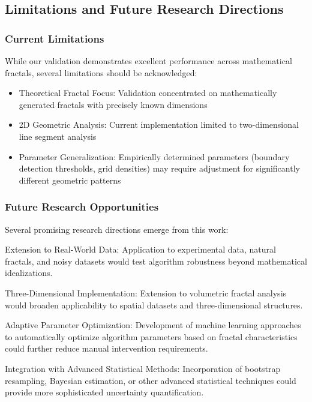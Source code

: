 \documentclass[preprint,12pt]{elsarticle}
\def\textbf#1{#1}%
\begin{document}
\subsection{Limitations and Future Research Directions}

\subsubsection{Current Limitations}

While our validation demonstrates excellent performance across mathematical fractals, several limitations should be acknowledged:

\begin{itemize}
\item \textbf{Theoretical Fractal Focus}: Validation concentrated on mathematically generated fractals with precisely known dimensions
\item \textbf{2D Geometric Analysis}: Current implementation limited to two-dimensional line segment analysis
\item \textbf{Parameter Generalization}: Empirically determined parameters (boundary detection thresholds, grid densities) may require adjustment for significantly different geometric patterns
\end{itemize}

\subsubsection{Future Research Opportunities}

Several promising research directions emerge from this work:

\textbf{Extension to Real-World Data}: Application to experimental data, natural fractals, and noisy datasets would test algorithm robustness beyond mathematical idealizations.

\textbf{Three-Dimensional Implementation}: Extension to volumetric fractal analysis would broaden applicability to spatial datasets and three-dimensional structures.

\textbf{Adaptive Parameter Optimization}: Development of machine learning approaches to automatically optimize algorithm parameters based on fractal characteristics could further reduce manual intervention requirements.

\textbf{Integration with Advanced Statistical Methods}: Incorporation of bootstrap resampling, Bayesian estimation, or other advanced statistical techniques could provide more sophisticated uncertainty quantification.
\end{document}
